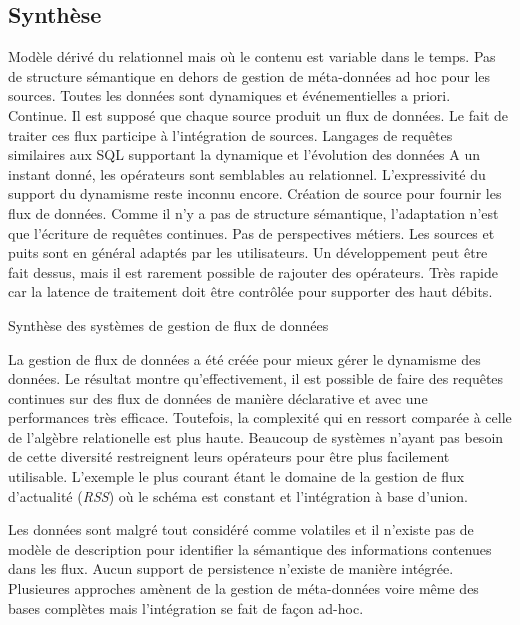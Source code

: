 \subsection{Synthèse}
\begin{table}[!ht]
\criteretabDonnee
    {Modèle dérivé du relationnel mais où le contenu est variable dans le temps.}
    {Pas de structure sémantique en dehors de gestion de méta-données ad hoc pour les sources.}
    {Toutes les données sont dynamiques et événementielles a priori.}
\criteretabTraitement
    {Continue.}
    {Il est supposé que chaque source produit un flux de données. Le fait de traiter ces flux participe à l'intégration de sources.}
    {Langages de requêtes similaires aux SQL supportant la dynamique et l'évolution des données}
    {A un instant donné, les opérateurs sont semblables au relationnel. L'expressivité du support du dynamisme reste inconnu encore.}
\criteretabAdaptabilite
    {Création de source pour fournir les flux de données. Comme il n'y a pas de structure sémantique, l'adaptation n'est que l'écriture de requêtes continues.}
    {Pas de perspectives métiers.}
    {Les sources et puits sont en général adaptés par les utilisateurs. Un développement peut être fait dessus, mais il est rarement possible de rajouter des opérateurs.}
    {Très rapide car la latence de traitement doit être contrôlée pour supporter des haut débits.}
\caption{Synthèse des systèmes de gestion de flux de données}\label{tab:rw:supervision:sgfd:synthese}
\end{table}

La gestion de flux de données a été créée pour mieux gérer le dynamisme des données. Le résultat montre qu'effectivement, il est possible de faire des requêtes continues sur des flux de données de manière déclarative et avec une performances très efficace. Toutefois, la complexité qui en ressort comparée à celle de l'algèbre relationelle est plus haute. Beaucoup de systèmes n'ayant pas besoin de cette diversité restreignent leurs opérateurs pour être plus facilement utilisable. L'exemple le plus courant étant le domaine de la gestion de flux d'actualité (\textit{RSS}) où le schéma est constant et l'intégration à base d'union.

Les données sont malgré tout considéré comme volatiles et il n'existe pas de modèle de description pour identifier la sémantique des informations contenues dans les flux. Aucun support de persistence n'existe de manière intégrée. Plusieures approches amènent de la gestion de méta-données voire même des bases complètes mais l'intégration se fait de façon ad-hoc.
